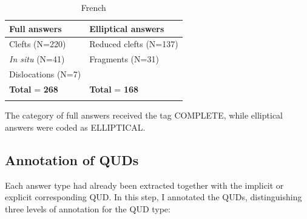\begin{table}
\caption{French}
\begin{tabularx}{0.8\textwidth} { 
   Q
   >{\arraybackslash} X }
 
 \lsptoprule
 \textbf{Full answers} & \textbf{Elliptical answers}  \\
 \midrule
 Clefts (N=220)  & Reduced clefts (N=137)  \\
\textit{In situ} (N=41) & Fragments (N=31) \\
Dislocations (N=7) & \\
\textbf{Total} = \textbf{268} & \textbf{Total} = \textbf{168}\\
\lspbottomrule
\end{tabularx}
\end{table}



 The category of full answers received the tag {\selectfont COMPLETE}, while elliptical answers were coded as {\selectfont ELLIPTICAL}.

\subsection{Annotation of QUDs} 

Each answer type had already been extracted together with the implicit or explicit corresponding QUD. In this step, I annotated the QUDs, distinguishing three levels of annotation for the QUD type:

